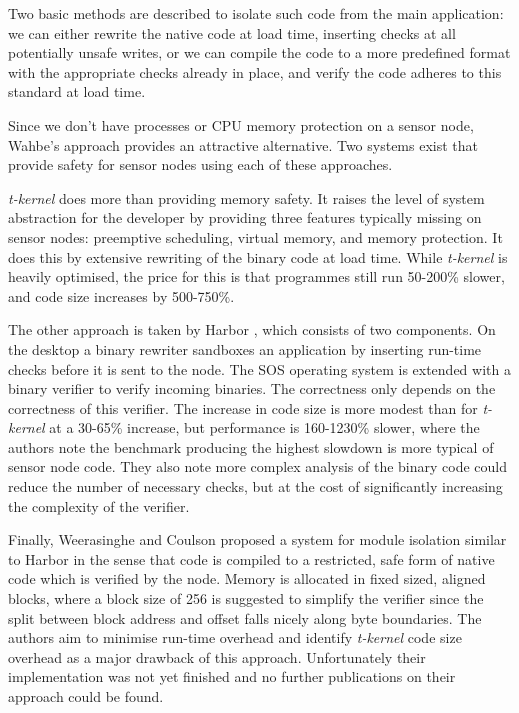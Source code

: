 Two basic methods are described to isolate such code from the main application: we can either rewrite the native code at load time, inserting checks at all potentially unsafe writes, or we can compile the code to a more predefined format with the appropriate checks already in place, and verify the code adheres to this standard at load time.

Since we don't have processes or CPU memory protection on a sensor node, Wahbe's approach provides an attractive alternative. Two systems exist that provide safety for sensor nodes using each of these approaches.

\emph{t-kernel} does more than providing memory safety. It raises the level of system abstraction for the developer by providing three features typically missing on sensor nodes: preemptive scheduling, virtual memory, and memory protection. It does this by extensive rewriting of the binary code at load time. While \emph{t-kernel} is heavily optimised, the price for this is that programmes still run 50-200\% slower, and code size increases by 500-750\%.

The other approach is taken by Harbor \cite{Kumar:2007ge}, which consists of two components. On the desktop a binary rewriter sandboxes an application by inserting run-time checks before it is sent to the node. The SOS operating system \cite{Han:2005th} is extended with a binary verifier to verify incoming binaries. The correctness only depends on the correctness of this verifier. The increase in code size is more modest than for \emph{t-kernel} at a 30-65\% increase, but performance is 160-1230\% slower, where the authors note the benchmark producing the highest slowdown is more typical of sensor node code. They also note more complex analysis of the binary code could reduce the number of necessary checks, but at the cost of significantly increasing the complexity of the verifier.

Finally, Weerasinghe and Coulson \cite{Weerasinghe:2008kh} proposed a system for module isolation similar to Harbor in the sense that code is compiled to a restricted, safe form of native code which is verified by the node. Memory is allocated in fixed sized, aligned blocks, where a block size of 256 is suggested to simplify the verifier since the split between block address and offset falls nicely along byte boundaries. The authors aim to minimise run-time overhead and identify \emph{t-kernel} code size overhead as a major drawback of this approach. Unfortunately their implementation was not yet finished and no further publications on their approach could be found.
